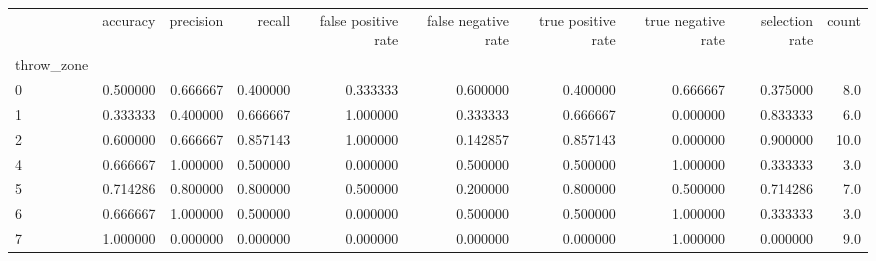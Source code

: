 \begin{tabular}{lrrrrrrrrr}
\toprule
{} &  accuracy &  precision &    recall &  false positive rate &  false negative rate &  true positive rate &  true negative rate &  selection rate &  count \\
throw\_zone &           &            &           &                      &                      &                     &                     &                 &        \\
\midrule
0          &  0.500000 &   0.666667 &  0.400000 &             0.333333 &             0.600000 &            0.400000 &            0.666667 &        0.375000 &    8.0 \\
1          &  0.333333 &   0.400000 &  0.666667 &             1.000000 &             0.333333 &            0.666667 &            0.000000 &        0.833333 &    6.0 \\
2          &  0.600000 &   0.666667 &  0.857143 &             1.000000 &             0.142857 &            0.857143 &            0.000000 &        0.900000 &   10.0 \\
4          &  0.666667 &   1.000000 &  0.500000 &             0.000000 &             0.500000 &            0.500000 &            1.000000 &        0.333333 &    3.0 \\
5          &  0.714286 &   0.800000 &  0.800000 &             0.500000 &             0.200000 &            0.800000 &            0.500000 &        0.714286 &    7.0 \\
6          &  0.666667 &   1.000000 &  0.500000 &             0.000000 &             0.500000 &            0.500000 &            1.000000 &        0.333333 &    3.0 \\
7          &  1.000000 &   0.000000 &  0.000000 &             0.000000 &             0.000000 &            0.000000 &            1.000000 &        0.000000 &    9.0 \\
\bottomrule
\end{tabular}
